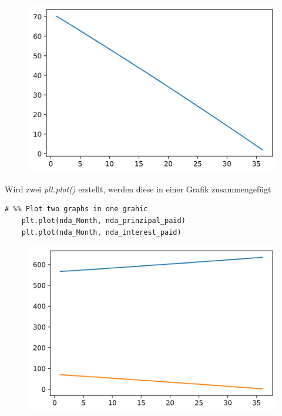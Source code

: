 \begin{figure}[H]
	\centering
	\includegraphics[scale = 0.8]{attachment/chapter_4/Scc015}
\end{figure}

Wird zwei \textit{plt.plot()} erstellt, werden diese in einer Grafik zusammengefügt
\begin{lstlisting}[style=Python]
	# %% Plot two graphs in one grahic
	plt.plot(nda_Month, nda_prinzipal_paid)
	plt.plot(nda_Month, nda_interest_paid)
\end{lstlisting}
\begin{figure}[H]
	\centering
	\includegraphics[scale = 0.8]{attachment/chapter_4/Scc016}
\end{figure}
